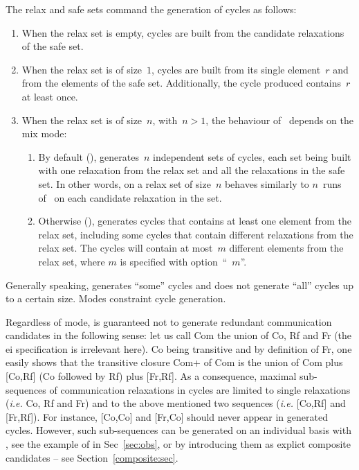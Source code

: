 The relax and safe sets command the generation of
cycles as follows:
\begin{enumerate}
\item When the relax set is empty,
cycles are built from the candidate relaxations of the safe set.
\item When the relax set is of size~$1$,
cycles are built from its single element~$r$ and from the elements of
the safe set. Additionally, the cycle produced contains~$r$ at least once.
\item
When the relax set is of size~$n$, with~$n > 1$,
the behaviour of~\diy{} depends on the mix mode:
\begin{enumerate}
\item
By default (),
\diy{} generates~$n$ independent sets of cycles,
each set being built with one relaxation from the relax set and all
the relaxations in the safe set.
In other words, \diy{} on a relax set of size~$n$ behaves similarly
to $n$~runs of~\diy{} on each candidate relaxation in the set.
\item Otherwise (), \diy{} generates cycles that contains
at least one element from the relax set, including some cycles
that contain different relaxations from the relax set.
The cycles will contain at most~$m$ different elements from the relax set,
where $m$ is specified with option~``~$m$''.
\end{enumerate}
\end{enumerate}

\label{mode:describe}Generally
speaking, \diy{} generates ``some'' cycles and does not generate
``all'' cycles up to a certain size. Modes constraint cycle generation.

Regardless of mode, \diy{} is guaranteed not to
generate redundant communication candidates in the following sense:
let us call Com the union of Co, Rf and Fr (the e\vbar{}i specification
is irrelevant here).
Co being transitive and by definition of Fr,
one easily shows that the transitive closure Com+ of Com is the union
of Com plus [Co,Rf] (Co followed by Rf) plus [Fr,Rf].
As a consequence, maximal sub-sequences of communication
relaxations in \diy{} cycles are limited
to  single relaxations (\emph{i.e.} Co, Rf and Fr)
and to the above mentioned two sequences
(\emph{i.e.} [Co,Rf] and  [Fr,Rf]).
For instance, [Co,Co] and [Fr,Co] should never appear in \diy{} generated
cycles. However, such sub-sequences can be generated on an individual basis with
\diyone, see the example of  in Sec~\ref{sec:obs},
or by introducing them as explict composite candidates -- see Section~\ref{composite:sec}.

